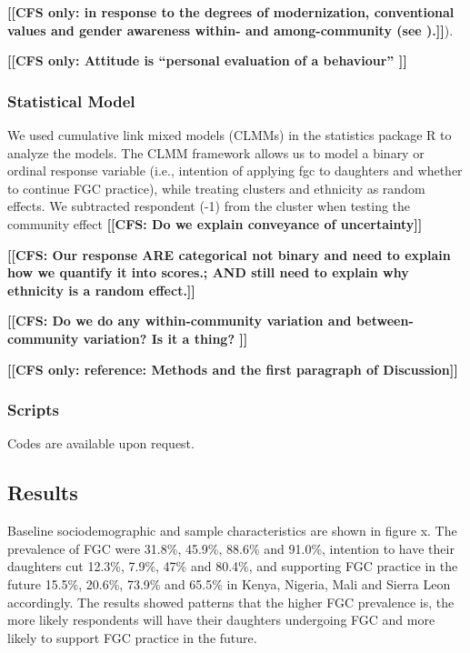 \documentclass[12pt,]{article}
\newcommand{\comment}[1]{\textbf{[[#1]]}}
\newcommand{\cfcmt}[1]{\comment{CFS: #1}}
\newcommand{\cfonly}[1]{\comment{CFS only: #1}}
\begin{document}
\cfonly {in response to the degrees of modernization, conventional values and gender awareness within- and among-community (see \cite{Achi14, BoylMcMo02, Hayf05, KandNwak09, ModrLiu13, Moor13, OdukAfol17, Youn02}).}).  

\cfonly{Attitude is “personal evaluation of a behaviour” \cite{Ajze91}}

\subsubsection{Statistical Model}\label{statistical-model}

We used cumulative link mixed models (CLMMs) in the statistics package R \cite{Rstats,Rpackage_ordinal} to analyze the models.  The CLMM framework allows us to model a binary or ordinal response variable (i.e., intention of applying fgc to daughters and whether to continue FGC practice), while treating clusters and ethnicity as random effects.  
We subtracted respondent (-1) from the cluster when testing the community effect 
\cfcmt{Do we explain conveyance of uncertainty}

\cfcmt{Our response ARE categorical not binary and need to explain how we quantify it into scores.; AND still need to explain why ethnicity is a random effect.}

\cfcmt{Do we do any within-community variation and between-community variation?  Is it a thing?
}

\cfonly{reference: Methods and the first paragraph of Discussion\cite{Chia14}}


\subsubsection{Scripts}\label{scripts}

Codes are available upon request. 

\subsection{Results}\label{results-1}

Baseline sociodemographic and sample characteristics are shown in figure x.  The prevalence of FGC were 31.8\%, 45.9\%, 88.6\% and 91.0\%, intention to have their daughters cut 12.3\%, 7.9\%, 47\% and 80.4\%, and supporting FGC practice in the future 15.5\%, 20.6\%, 73.9\% and 65.5\% in Kenya, Nigeria, Mali and Sierra Leon accordingly.  The results showed patterns that the higher FGC prevalence is, the more likely respondents will have their daughters undergoing FGC and more likely to support FGC practice in the future.  
\end{document}
